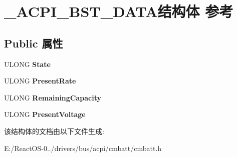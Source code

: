 \hypertarget{struct___a_c_p_i___b_s_t___d_a_t_a}{}\section{\+\_\+\+A\+C\+P\+I\+\_\+\+B\+S\+T\+\_\+\+D\+A\+T\+A结构体 参考}
\label{struct___a_c_p_i___b_s_t___d_a_t_a}
\subsection*{Public 属性}
\begin{DoxyCompactItemize}
\item 
\mbox{\label{struct___a_c_p_i___b_s_t___d_a_t_a_a597d330c6b087630334a08c3533d0e5b}} 
U\+L\+O\+NG {\bfseries State}
\item 
\mbox{\label{struct___a_c_p_i___b_s_t___d_a_t_a_a37b3ff5c4214e836ad31d97a23c3da92}} 
U\+L\+O\+NG {\bfseries Present\+Rate}
\item 
\mbox{\label{struct___a_c_p_i___b_s_t___d_a_t_a_a43aeecfe53483ea74df673c1ebab8c1f}} 
U\+L\+O\+NG {\bfseries Remaining\+Capacity}
\item 
\mbox{\label{struct___a_c_p_i___b_s_t___d_a_t_a_a51f13cb36e1f4c2cbb04cbe56e6daa08}} 
U\+L\+O\+NG {\bfseries Present\+Voltage}
\end{DoxyCompactItemize}


该结构体的文档由以下文件生成\+:\begin{DoxyCompactItemize}
\item 
E\+:/\+React\+O\+S-\/0../drivers/bus/acpi/cmbatt/cmbatt.\+h\end{DoxyCompactItemize}

